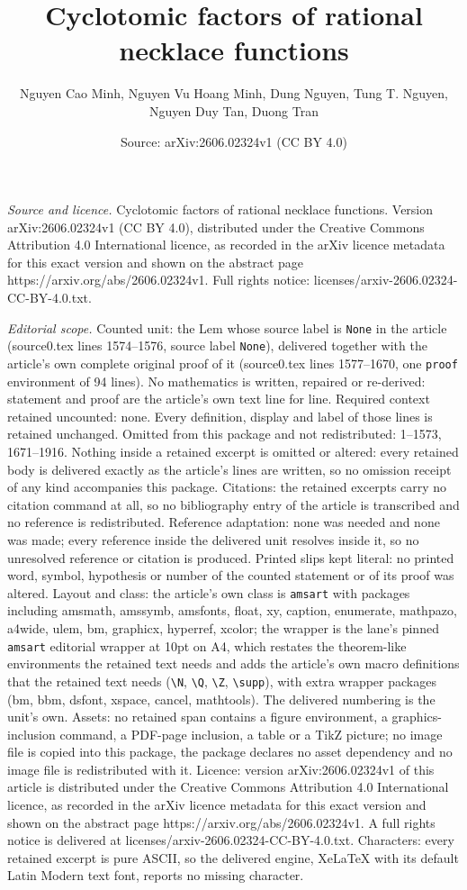 \documentclass[10pt,a4paper]{amsart}
\title[Cyclotomic factors of rational necklace functions]{Cyclotomic factors of rational necklace functions}
\author{Nguyen Cao Minh, Nguyen Vu Hoang Minh, Dung Nguyen, Tung T. Nguyen, Nguyen Duy Tan, Duong Tran}
\date{Source: arXiv:2606.02324v1 (CC BY 4.0)}
\begin{document}
\maketitle

\noindent\emph{Source and licence.} Cyclotomic factors of rational necklace functions. Version arXiv:2606.02324v1 (CC BY 4.0), distributed under the Creative Commons Attribution 4.0 International licence, as recorded in the arXiv licence metadata for this exact version and shown on the abstract page https://arxiv.org/abs/2606.02324v1. Full rights notice: licenses/arxiv-2606.02324-CC-BY-4.0.txt.\par\smallskip

\noindent\textit{Editorial scope.} Counted unit: the Lem whose source label is \texttt{None} in the article (source0.tex lines 1574--1576, source label \texttt{None}), delivered together with the article's own complete original proof of it (source0.tex lines 1577--1670, one \texttt{proof} environment of 94 lines). No mathematics is written, repaired or re-derived: statement and proof are the article's own text line for line. Required context retained uncounted: none. Every definition, display and label of those lines is retained unchanged. Omitted from this package and not redistributed: 1--1573, 1671--1916. Nothing inside a retained excerpt is omitted or altered: every retained body is delivered exactly as the article's lines are written, so no omission receipt of any kind accompanies this package. Citations: the retained excerpts carry no citation command at all, so no bibliography entry of the article is transcribed and no reference is redistributed. Reference adaptation: none was needed and none was made; every reference inside the delivered unit resolves inside it, so no unresolved reference or citation is produced. Printed slips kept literal: no printed word, symbol, hypothesis or number of the counted statement or of its proof was altered. Layout and class: the article's own class is \texttt{amsart} with packages including amsmath, amssymb, amsfonts, float, xy, caption, enumerate, mathpazo, a4wide, ulem, bm, graphicx, hyperref, xcolor; the wrapper is the lane's pinned \texttt{amsart} editorial wrapper at 10pt on A4, which restates the theorem-like environments the retained text needs and adds the article's own macro definitions that the retained text needs (\texttt{\textbackslash N}, \texttt{\textbackslash Q}, \texttt{\textbackslash Z}, \texttt{\textbackslash supp}), with extra wrapper packages (bm, bbm, dsfont, xspace, cancel, mathtools). The delivered numbering is the unit's own. Assets: no retained span contains a figure environment, a graphics-inclusion command, a PDF-page inclusion, a table or a TikZ picture; no image file is copied into this package, the package declares no asset dependency and no image file is redistributed with it. Licence: version arXiv:2606.02324v1 of this article is distributed under the Creative Commons Attribution 4.0 International licence, as recorded in the arXiv licence metadata for this exact version and shown on the abstract page https://arxiv.org/abs/2606.02324v1. A full rights notice is delivered at licenses/arxiv-2606.02324-CC-BY-4.0.txt. Characters: every retained excerpt is pure ASCII, so the delivered engine, XeLaTeX with its default Latin Modern text font, reports no missing character.
\end{document}
